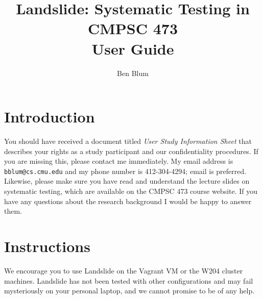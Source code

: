 \documentclass{article}
\begin{document}

\newcommand\classname{CMPSC 473\xspace}
\title{\bf Landslide: Systematic Testing in \classname \\ User Guide}
\author{Ben Blum}
\date{}
\maketitle

\section{Introduction}

You should have received a document titled {\em User Study Information Sheet} that describes your rights as a study
participant and our confidentiality procedures. If you are missing this, please contact me immediately. My email
address is {\tt bblum@cs.cmu.edu} and my phone number is 412-304-4294; email is preferred.
\\

\noindent Likewise, please make sure you have read and understand the lecture slides on systematic testing, which are
available on the \classname course website. If you have any questions about the research background I would be
happy to answer them.

\section{Instructions}

We encourage you to use Landslide on the Vagrant VM or the W204 cluster machines.
Landslide has not been tested with other configurations and may fail
mysteriously on your personal laptop, and we cannot promise to be of any help.
\end{document}
